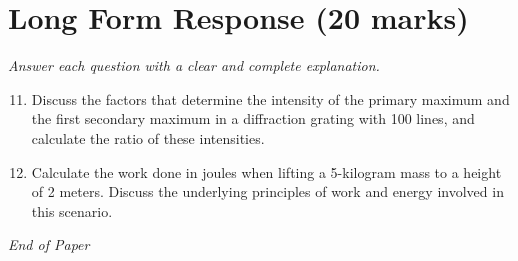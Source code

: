 \documentclass[12pt]{article}
\begin{document}
\section*{Long Form Response (20 marks)}
\textit{Answer each question with a clear and complete explanation.}
\begin{enumerate}[label=\arabic*.]
\setcounter{enumi}{10}
\item Discuss the factors that determine the intensity of the primary maximum and the first secondary maximum in a diffraction grating with 100 lines, and calculate the ratio of these intensities.
\item Calculate the work done in joules when lifting a 5-kilogram mass to a height of 2 meters. Discuss the underlying principles of work and energy involved in this scenario.
\end{enumerate}

\vfill
\noindent\textit{End of Paper}
\end{document}
